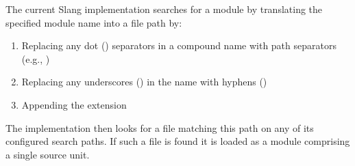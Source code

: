 \begin{Note}
The current Slang implementation searches for a module by translating the specified module name into a file path by:
\begin{enumerate}
    \item{Replacing any dot () separators in a compound name with path separators (e.g., \Char{/})}
    \item{Replacing any underscores (\Char{_}) in the name with hyphens (\Char{-})}
    \item{Appending the extension }
\end{enumerate}
The implementation then looks for a file matching this path on any of its configured search paths.
If such a file is found it is loaded as a module comprising a single source unit.
\end{Note}




























